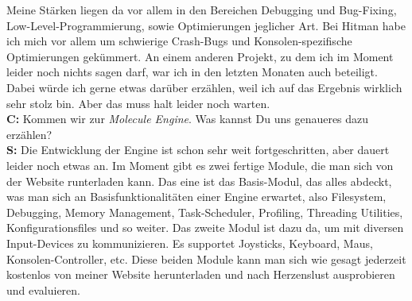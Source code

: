 Meine Stärken liegen da vor allem in den Bereichen Debugging und Bug-Fixing, Low-Level-Programmierung, sowie Optimierungen jeglicher Art. Bei Hitman habe ich mich vor allem um schwierige Crash-Bugs und Konsolen-spezifische Optimierungen gekümmert. An einem anderen Projekt, zu dem ich im Moment leider noch nichts sagen darf, war ich in den letzten Monaten auch beteiligt. Dabei würde ich gerne etwas darüber erzählen, weil ich auf das Ergebnis wirklich sehr stolz bin. Aber das muss halt leider noch warten. \\
\textbf{C:} Kommen wir zur \textit{Molecule Engine}. Was kannst Du uns genaueres dazu erzählen? \\
\textbf{S:} Die Entwicklung der Engine ist schon sehr weit fortgeschritten, aber dauert leider noch etwas an. Im  Moment gibt es zwei fertige Module, die man sich von der Website runterladen kann. Das eine ist das Basis-Modul, das alles abdeckt, was man sich an Basisfunktionalitäten einer Engine erwartet, also Filesystem, Debugging, Memory Management, Task-Scheduler, Profiling, Threading Utilities, Konfigurationsfiles und so weiter. Das zweite Modul ist dazu da, um mit diversen Input-Devices zu kommunizieren. Es supportet Joysticks, Keyboard, Maus, Konsolen-Controller, etc. Diese beiden Module kann man sich wie gesagt jederzeit kostenlos von meiner Website herunterladen und nach Herzenslust ausprobieren und evaluieren.

